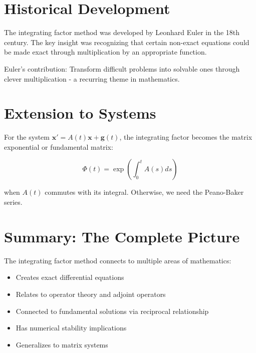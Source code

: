 \documentclass[12pt]{article}
\begin{document}
\section{Historical Development}

The integrating factor method was developed by Leonhard Euler in the 18th century. The key insight was recognizing that certain non-exact equations could be made exact through multiplication by an appropriate function.

\begin{keypoint}
Euler's contribution: Transform difficult problems into solvable ones through clever multiplication - a recurring theme in mathematics.
\end{keypoint}

\section{Extension to Systems}

For the system $\mathbf{x}' = A(t)\mathbf{x} + \mathbf{g}(t)$, the integrating factor becomes the matrix exponential or fundamental matrix:

\begin{equation}
\Phi(t) = \exp\left(\int_0^t A(s)ds\right)
\end{equation}

when $A(t)$ commutes with its integral. Otherwise, we need the Peano-Baker series.

\section{Summary: The Complete Picture}

The integrating factor method connects to multiple areas of mathematics:
\begin{itemize}
\item Creates exact differential equations
\item Relates to operator theory and adjoint operators  
\item Connected to fundamental solutions via reciprocal relationship
\item Has numerical stability implications
\item Generalizes to matrix systems
\end{itemize}
\end{document}
